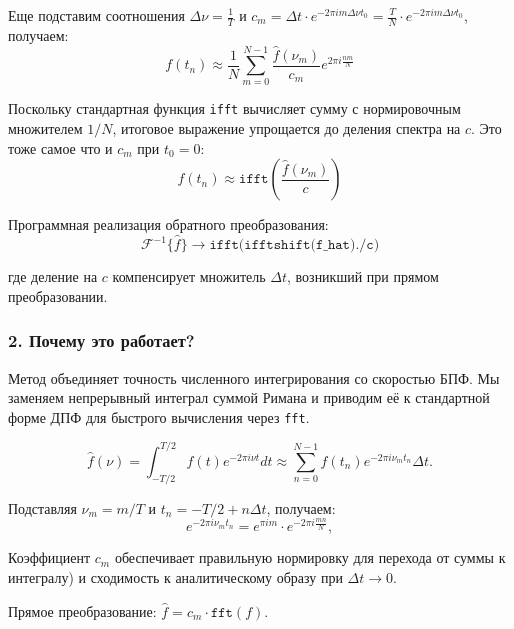\documentclass[a4paper, 12pt]{article}
\begin{document}
Еще подставим соотношения $\Delta \nu = \frac{1}{T}$ и $c_m = \Delta t \cdot e^{-2\pi i m\Delta \nu t_0} = \frac{T}{N} \cdot e^{-2\pi i m\Delta \nu t_0}$, получаем:
\begin{equation*}
    f(t_n) \approx \frac{1}{N} \sum_{m=0}^{N-1} \frac{\hat{f}(\nu_m)}{c_m} e^{2\pi i \frac{nm}{N}}
\end{equation*}

Поскольку стандартная функция \texttt{ifft} вычисляет сумму с нормировочным множителем $1/N$, итоговое выражение упрощается до деления спектра на $c$. Это тоже самое что и $c_m$ при $t_0 = 0$:
\begin{equation*}
    f(t_n) \approx \texttt{ifft}\left( \frac{\hat{f}(\nu_m)}{c} \right)
\end{equation*}

Программная реализация обратного преобразования:
\begin{equation*}
    \mathcal{F}^{-1}\{\hat{f}\} \rightarrow \texttt{ifft(ifftshift(f\_hat)./c)}
\end{equation*}

где деление на $c$ компенсирует множитель $\Delta t$, возникший при прямом преобразовании.


\subsubsection*{2. Почему это работает?}

Метод объединяет точность численного интегрирования со скоростью БПФ. Мы заменяем непрерывный интеграл суммой Римана и приводим её к стандартной форме ДПФ для быстрого вычисления через \texttt{fft}.

\begin{equation*}
    \hat{f}(\nu) = \int_{-T/2}^{T/2} f(t) e^{-2\pi i \nu t} dt \approx \sum_{n=0}^{N-1} f(t_n) e^{-2\pi i \nu_m t_n} \Delta t.
\end{equation*}

Подставляя $\nu_m = m/T$ и $t_n = -T/2 + n\Delta t$, получаем:
\begin{equation*}
    e^{-2\pi i \nu_m t_n} = e^{\pi i m} \cdot e^{-2\pi i \frac{mn}{N}},
\end{equation*}

Коэффициент $c_m$ обеспечивает правильную нормировку для перехода от суммы к интегралу) и сходимость к аналитическому образу при $\Delta t \to 0$.

Прямое преобразование: $\hat{f} = c_m \cdot \texttt{fft}(f)$.
\end{document}
